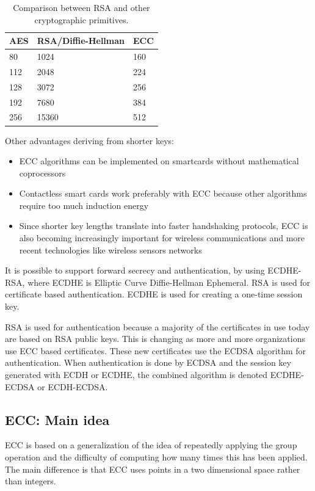 \begin{table}[b]
	\centering
	\begin{tabular}{ |p{4cm}|p{4cm}|p{4cm}|  }
		\hline
		AES& RSA/Diffie-Hellman&ECC\\
		\hline
		80 & 1024 & 160\\
		112 & 2048 & 224\\
		128 & 3072 & 256\\
		192 & 7680 & 384\\
		256 & 15360 & 512\\
		\hline			
	\end{tabular}
	\caption{Comparison between RSA and other cryptographic primitives.}
	\label{table:comparison_rsa_ecc}
\end{table}

Other advantages deriving from shorter keys:
\begin{itemize}
	\item ECC algorithms can be implemented on smartcards without mathematical coprocessors
	\item Contactless smart cards work preferably with ECC because other algorithms require too much induction energy
	\item Since shorter key lengths translate into faster handshaking protocols, ECC is also becoming increasingly important for wireless communications and more recent technologies like wireless sensors networks
\end{itemize}

It is possible to support forward secrecy and authentication, by using ECDHE-RSA, where ECDHE is Elliptic Curve Diffie-Hellman Ephemeral. RSA is used for certificate based authentication. ECDHE is used for creating a one-time session key.

RSA is used for authentication because a majority of the certificates in use today are based on RSA public keys. This is changing as more and more organizations use ECC based certificates. These new certificates use the ECDSA algorithm for authentication. When authentication is done by ECDSA and the session key generated with ECDH or ECDHE, the combined algorithm is denoted ECDHE-ECDSA or ECDH-ECDSA.


\subsection{ECC: Main idea}
ECC is based on a generalization of the idea of repeatedly applying the group operation and the difficulty of computing how many times this has been applied. The main difference is that ECC uses points in a two dimensional space rather than integers.

